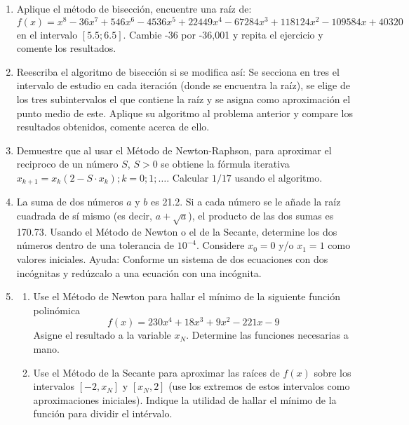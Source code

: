 \documentclass[12pt,letterpaper]{article}
\begin{document}
\begin{enumerate}

\item Aplique el m\'etodo de bisecci\'on, encuentre una ra\'iz de:
$$
f(x) = x^8 - 36x^7 + 546x^6 - 4536x^5 + 22449x^4 - 67284x^3 + 118124x^
2 - 109584x + 40320
$$
en el intervalo $[5.5; 6.5]$. Cambie -36 por -36,001 y repita el ejercicio y comente los resultados.

\item Reescriba el algoritmo de bisecci\'on si se modifica as\'i: Se secciona en tres el intervalo de estudio en cada
iteraci\'on (donde se encuentra la ra\'iz), se elige de los tres subintervalos el que contiene la ra\'iz y se asigna
como aproximaci\'on el punto medio de este. Aplique su algoritmo al problema anterior y compare los
resultados obtenidos, comente acerca de ello.

\item Demuestre que al usar el M\'etodo de Newton-Raphson, para aproximar el reciproco de
un n\'umero $S$, $S > 0$ se obtiene la f\'ormula iterativa $x_{k+1} = x_k(2 - S\cdot x_k); k = 0; 1; \ldots$. Calcular $1/17$ usando el algoritmo.

\item La suma de dos n\'umeros $a$ y $b$ es 21.2. Si a cada n\'umero se le a\~nade la ra\'iz cuadrada de s\'i mismo (es
decir, $a + \sqrt{a}$), el producto de las dos sumas es 170.73. Usando el M\'etodo de Newton o el de la Secante, determine
los dos n\'umeros dentro de una tolerancia de $10^{-4}$. Considere $x_0 = 0$ y/o $x_1 = 1$ como valores
iniciales. Ayuda: Conforme un sistema de dos ecuaciones con dos inc\'ognitas y red\'uzcalo a una ecuaci\'on
con una inc\'ognita.

\item \begin{enumerate}
    \item Use el M\'etodo de Newton para hallar el m\'inimo de la siguiente funci\'on polin\'omica
    $$
    f(x) = 230x^4 + 18x^3 + 9x^2 - 221x - 9
    $$    
    Asigne el resultado a la variable $x_N$. Determine las funciones necesarias a mano.
    \item Use el M\'etodo de la Secante para aproximar las ra\'ices de $f(x)$ sobre los intervalos $[-2, x_N]$ y
    $[x_N, 2]$ (use los extremos de estos intervalos como aproximaciones iniciales). Indique la utilidad de
    hallar el m\'inimo de la funci\'on para dividir el int\'ervalo.
\end{enumerate}


\end{enumerate}
\end{document}
